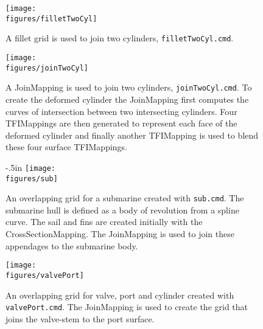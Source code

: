 \documentclass[xcolor=rgb,svgnames,dvipsnames]{article}
\newcommand{\figures}{\homeHenshaw/OvertureFigures}
\begin{document}
\newcommand{\figHeight}{3.75in}
\newcommand{\figWidths}{12cm}

\begin{figure}[htb]
  \begin{center}
   \texttt{[image: \\figures/filletTwoCyl]}
  \caption{A fillet grid is used to join two cylinders, {\tt filletTwoCyl.cmd}.}
  \end{center}
\end{figure}

\begin{figure}[hbt]
  \begin{center}
   \texttt{[image: \\figures/joinTwoCyl]}
  \caption{A JoinMapping is used to join two cylinders, {\tt joinTwoCyl.cmd}. To create the deformed
     cylinder the JoinMapping first computes the curves of intersection between two intersecting
      cylinders. Four TFIMappings are then generated to represent each face of the deformed cylinder
       and finally another TFIMapping is used to blend these four surface TFIMappings. }
  \end{center}
\end{figure}

\begin{figure}[hbt]
  \begin{center}
   \vglue-.5in
   \texttt{[image: \\figures/sub]}
  \caption{An overlapping grid for a submarine created with {\tt sub.cmd}. The submarine hull is
   defined as a body of revolution from a spline curve. The sail and fins are
     created initially with the CrossSectionMapping. The JoinMapping is used to join these appendages
     to the submarine body.}
  \end{center}
\end{figure}

\begin{figure}[hbt]
  \begin{center}
   \texttt{[image: \\figures/valvePort]}
  \caption{An overlapping grid for valve, port and cylinder created with {\tt valvePort.cmd}. 
    The JoinMapping is used to create the
    grid that joins the valve-stem to the port surface.}
  \end{center}
\end{figure}
\end{document}

